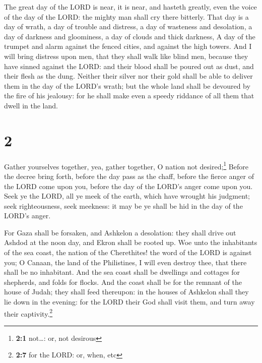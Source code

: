  The great day of the LORD is near, it is near, and
hasteth greatly, even the voice of the day of the LORD: the mighty man
shall cry there bitterly.  That day is a day of wrath, a
day of trouble and distress, a day of wasteness and desolation, a day of
darkness and gloominess, a day of clouds and thick darkness,
 A day of the trumpet and alarm against the fenced
cities, and against the high towers.  And I will bring
distress upon men, that they shall walk like blind men, because they
have sinned against the LORD: and their blood shall be poured out as
dust, and their flesh as the dung.  Neither their silver
nor their gold shall be able to deliver them in the day of the LORD's
wrath; but the whole land shall be devoured by the fire of his jealousy:
for he shall make even a speedy riddance of all them that dwell in the
land.

\hypertarget{section-1}{%
\section{2}\label{section-1}}

 Gather yourselves together, yea, gather together, O
nation not desired;\footnote{\textbf{2:1} not\ldots: or, not desirous}
 Before the decree bring forth, before the day pass as the
chaff, before the fierce anger of the LORD come upon you, before the day
of the LORD's anger come upon you.  Seek ye the LORD, all
ye meek of the earth, which have wrought his judgment; seek
righteousness, seek meekness: it may be ye shall be hid in the day of
the LORD's anger.

 For Gaza shall be forsaken, and Ashkelon a desolation:
they shall drive out Ashdod at the noon day, and Ekron shall be rooted
up.  Woe unto the inhabitants of the sea coast, the nation
of the Cherethites! the word of the LORD is against you; O Canaan, the
land of the Philistines, I will even destroy thee, that there shall be
no inhabitant.  And the sea coast shall be dwellings and
cottages for shepherds, and folds for flocks.  And the
coast shall be for the remnant of the house of Judah; they shall feed
thereupon: in the houses of Ashkelon shall they lie down in the evening:
for the LORD their God shall visit them, and turn away their
captivity.\footnote{\textbf{2:7} for the LORD: or, when, etc}

